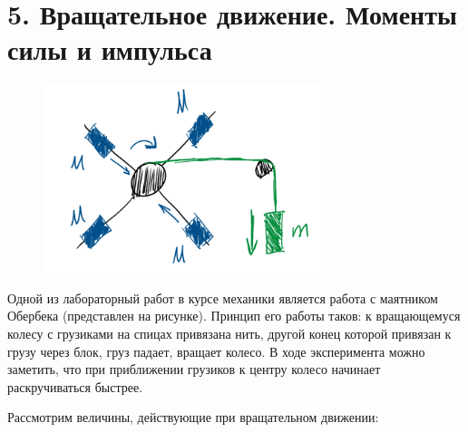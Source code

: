 \documentclass[12pt]{article}
\begin{document}

    \section{5. Вращательное движение. Моменты силы и импульса}

    \begin{minipage}{\textwidth}
        \begin{figure}
            \includegraphics[height=5.5cm]{physics1/images/physics1_2024_10_07_1}
        \end{figure}

        Одной из лабораторный работ в курсе механики является работа с маятником Обербека (представлен на рисунке).
        Принцип его работы таков: к вращающемуся колесу с грузиками на спицах привязана нить, другой конец которой
        привязан к грузу через блок, груз падает, вращает колесо. В ходе эксперимента можно заметить, что при приближении
        грузиков к центру колесо начинает раскручиваться быстрее.

    \end{minipage}

    \mediumvspace

    Рассмотрим величины, действующие при вращательном движении:

    \smallvspace
\end{document}
